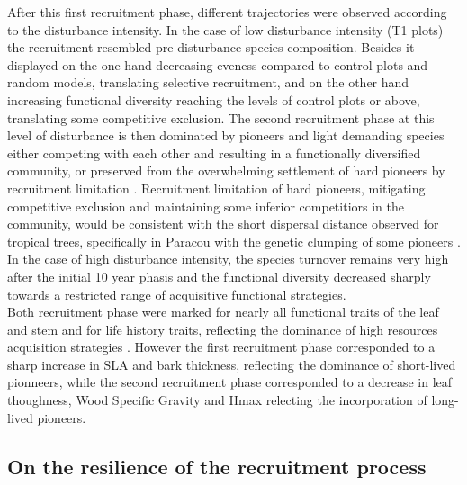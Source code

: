 \documentclass[fleqn,10pt]{ArtEcoFoG} %
\begin{document}
After this first recruitment phase, different trajectories were observed
according to the disturbance intensity. In the case of low disturbance
intensity (T1 plots) the recruitment resembled pre-disturbance species
composition. Besides it displayed on the one hand decreasing eveness
compared to control plots and random models, translating selective
recruitment, and on the other hand increasing functional diversity
reaching the levels of control plots or above, translating some
competitive exclusion. The second recruitment phase at this level of
disturbance is then dominated by pioneers and light demanding species
either competing with each other and resulting in a functionally
diversified community, or preserved from the overwhelming settlement of
hard pioneers by recruitment limitation
\citep{Hubbell1999, Sheil2003, Bongers2009}. Recruitment limitation of
hard pioneers, mitigating competitive exclusion and maintaining some
inferior competitiors in the community, would be consistent with the
short dispersal distance observed for tropical trees, specifically in
Paracou with the genetic clumping of some pioneers
\citep{Leclerc2015, Scotti2015a}. In the case of high disturbance
intensity, the species turnover remains very high after the initial 10
year phasis and the functional diversity decreased sharply towards a
restricted range of acquisitive functional strategies.\\
Both recruitment phase were marked for nearly all functional traits of
the leaf and stem and for life history traits, reflecting the dominance
of high resources acquisition strategies
\citep{Wright2004, Chave2009b, Herault2011, Reich2014}. However the
first recruitment phase corresponded to a sharp increase in SLA and bark
thickness, reflecting the dominance of short-lived pionneers, while the
second recruitment phase corresponded to a decrease in leaf thoughness,
Wood Specific Gravity and Hmax relecting the incorporation of long-lived
pioneers.

\subsection{On the resilience of the recruitment
process}\label{on-the-resilience-of-the-recruitment-process}
\end{document}
